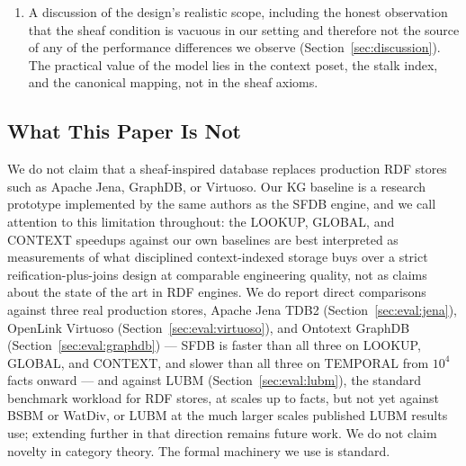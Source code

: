 \begin{enumerate}
          that tightening the cross-engine verification harness during
          this evaluation caught a real semantic bug in the sheaf
          engine's LOOKUP path (Section~\ref{sec:correctness}), which we
          take as evidence for the verification methodology, not just
          for the numbers. Two further comparisons, a real-world case study
          (Section~\ref{sec:eval:wikidata}, \wikidatanumfacts{}
          genuine Wikidata facts) and the LUBM standard benchmark workload
          (Section~\ref{sec:eval:lubm}, up to \lubmlargescale{} facts),
          confirm
          the LOOKUP/GLOBAL/CONTEXT advantage on both while leaving TEMPORAL
          in a different place on each, and building the LUBM comparison
          surfaced a genuine CONTEXT-resolution performance bug
          (Section~\ref{sec:discussion:threats}) that had been present
          throughout the entire evaluation, requiring every CONTEXT number
          in this paper to be re-measured after the fix.

    \item A discussion of the design's realistic scope, including the
          honest observation that the sheaf condition is vacuous in our
          setting and therefore not the source of any of the performance
          differences we observe (Section~\ref{sec:discussion}). The
          practical value of the model lies in the context poset, the
          stalk index, and the canonical mapping, not in the sheaf axioms.
\end{enumerate}

\subsection*{What This Paper Is Not}

We do not claim that a sheaf-inspired database replaces production RDF
stores such as Apache Jena, GraphDB, or Virtuoso. Our KG baseline is a
research prototype implemented by the same authors as the SFDB engine, and
we call attention to this limitation throughout: the LOOKUP, GLOBAL, and
CONTEXT speedups against our own baselines
are best interpreted as measurements of what disciplined
context-indexed storage buys over a strict reification-plus-joins design at
comparable engineering quality, not as claims about the state of the art in
RDF engines. We do report direct comparisons against three real production
stores, Apache Jena TDB2 (Section~\ref{sec:eval:jena}), OpenLink
Virtuoso (Section~\ref{sec:eval:virtuoso}), and Ontotext GraphDB
(Section~\ref{sec:eval:graphdb}) --- SFDB is faster than all three
on LOOKUP, GLOBAL, and CONTEXT, and slower than all three on TEMPORAL from
$10^4$ facts onward --- and against LUBM
(Section~\ref{sec:eval:lubm}), the standard benchmark workload for RDF
stores, at scales up to \lubmlargescale{} facts, but not yet against
BSBM or WatDiv, or LUBM at the much larger scales published LUBM
results use; extending further in that direction remains future
work. We do not claim novelty in category theory. The formal machinery we use is
standard.

